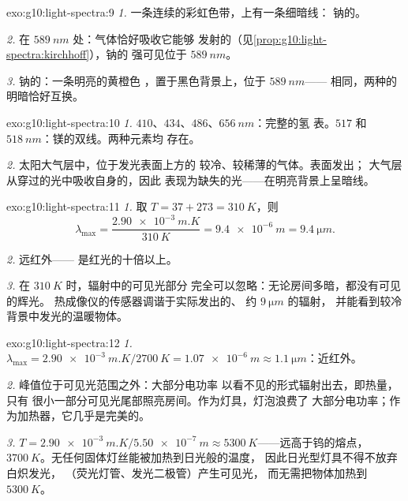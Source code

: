 \begin{solution}{exo:g10:light-spectra:9}
\emph{1.} 一条连续的彩虹色带，上有一条细暗线：
钠的。

\emph{2.} 在 $\qty{589}{nm}$ 处：气体恰好吸收它能够
发射的（见\cref{prop:g10:light-spectra:kirchhoff}），钠的
强可见位于 $\qty{589}{nm}$。

\emph{3.} 钠的：一条明亮的黄橙色
，置于黑色背景上，位于 $\qty{589}{nm}$——
相同，两种的明暗恰好互换。
\end{solution}

\begin{solution}{exo:g10:light-spectra:10}
\emph{1.} $410$、$434$、$486$、$\qty{656}{nm}$：完整的氢
表。$517$ 和 $\qty{518}{nm}$：镁的双线。两种元素均
存在。

\emph{2.} 太阳大气层中，位于发光表面上方的
较冷、较稀薄的气体。表面发出；
大气层从穿过的光中吸收自身的，因此
表现为缺失的光——在明亮背景上呈暗线。
\end{solution}

\begin{solution}{exo:g10:light-spectra:11}
\emph{1.} 取 $T = 37 + 273 = \qty{310}{K}$，则
\[
\lambda_{\max} = \frac{\qty{2.90e-3}{m.K}}{\qty{310}{K}}
= \qty{9.4e-6}{m} = \qty{9.4}{\micro m}.
\]

\emph{2.} 远红外——
是红光的十倍以上。

\emph{3.} 在 $\qty{310}{K}$ 时，辐射中的可见光部分
完全可以忽略：无论房间多暗，都没有可见的辉光。
热成像仪的传感器调谐于实际发出的、
约 $\qty{9}{\micro m}$ 的辐射，
并能看到较冷背景中发光的温暖物体。
\end{solution}

\begin{solution}{exo:g10:light-spectra:12}
\emph{1.} $\lambda_{\max} = \qty{2.90e-3}{m.K} / \qty{2700}{K}
= \qty{1.07e-6}{m} \approx \qty{1.1}{\micro m}$：近红外。

\emph{2.} 峰值位于可见光范围之外：大部分电功率
以看不见的形式辐射出去，即热量，只有
很小一部分可见光尾部照亮房间。作为灯具，灯泡浪费了
大部分电功率；作为加热器，它几乎是完美的。

\emph{3.} $T = \qty{2.90e-3}{m.K} / \qty{5.50e-7}{m} \approx
\qty{5300}{K}$——远高于钨的熔点，
$\qty{3700}{K}$。无任何固体灯丝能被加热到日光般的温度，
因此日光型灯具不得不放弃白炽发光，
（荧光灯管、发光二极管）产生可见光，
而无需把物体加热到 $\qty{5300}{K}$。
\end{solution}


